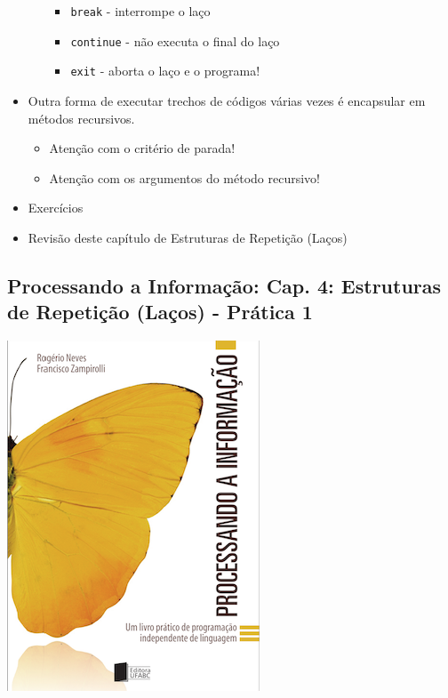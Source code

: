 \documentclass[12pt,a4paper]{article}
\providecommand{\tightlist}{%
      \setlength{\itemsep}{0pt}\setlength{\parskip}{0pt}}
\begin{document}
\begin{itemize}
\begin{itemize}
    \begin{itemize}
    \tightlist
    \item
      \texttt{break} - interrompe o laço
    \item
      \texttt{continue} - não executa o final do laço
    \item
      \texttt{exit} - aborta o laço e o programa!
    \end{itemize}
  \end{itemize}
\item
  Outra forma de executar trechos de códigos várias vezes é encapsular
  em métodos recursivos.

  \begin{itemize}
  \tightlist
  \item
    Atenção com o critério de parada!
  \item
    Atenção com os argumentos do método recursivo!
  \end{itemize}
\item
  Exercícios
\item
  Revisão deste capítulo de Estruturas de Repetição (Laços)
\end{itemize}

    \hypertarget{processando-a-informauxe7uxe3o-cap.-4-estruturas-de-repetiuxe7uxe3o-lauxe7os---pruxe1tica-1}{%
\subsection{Processando a Informação: Cap. 4: Estruturas de Repetição
(Laços) - Prática
1}\label{processando-a-informauxe7uxe3o-cap.-4-estruturas-de-repetiuxe7uxe3o-lauxe7os---pruxe1tica-1}}

    \includegraphics{"figs/Capa_Processando_Informacao.jpg"}
\end{document}
